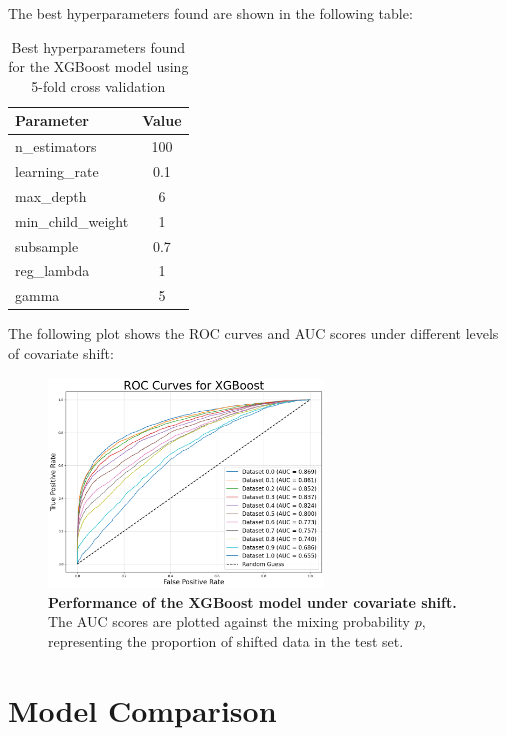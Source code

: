 The best hyperparameters found are shown in the following table:

\vspace{0.3em}

\begin{table}[H]
	\centering
	\begin{tabular}{l|c}
	\toprule
	\textbf{Parameter} & \textbf{Value} \\
	\midrule
	n\_estimators & 100 \\
	learning\_rate & 0.1 \\
	max\_depth & 6 \\
	min\_child\_weight & 1 \\
	subsample & 0.7 \\
	reg\_lambda & 1 \\
	gamma & 5 \\
	\bottomrule
	\end{tabular}
	\caption{Best hyperparameters found for the XGBoost model using 5-fold cross validation}
\end{table}

The following plot shows the ROC curves and AUC scores under different levels of covariate shift:

\vspace{0.5em}

\begin{figure}[H]
	\centering
	\includegraphics[width=0.65\textwidth]{assets/xgb_auc.png}
	\caption{\textbf{Performance of the XGBoost model under covariate shift.} \newline The AUC scores are plotted against the mixing probability $p$, representing the proportion of shifted data in the test set.}
	\label{fig:xgboost-perf}
\end{figure}

\section{Model Comparison}

